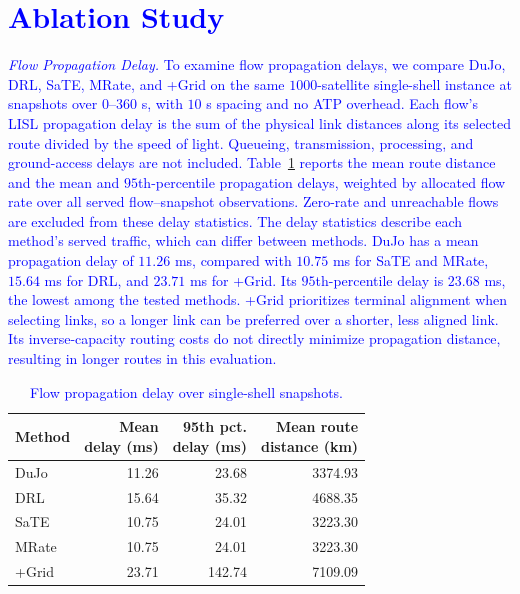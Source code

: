\documentclass[journal]{IEEEtran}
\newcommand{\blue}[1]{\textcolor{blue}{#1}}
\begin{document}
\section{\blue{Ablation Study}}\label{appendix:ablation_study}
\noindent\textit{\blue{Flow Propagation Delay.}} \blue{To examine flow propagation delays, we compare DuJo, DRL, SaTE, MRate, and +Grid on the same $1000$-satellite single-shell instance at snapshots over $0$--$360$ s, with $10$ s spacing and no ATP overhead. Each flow's LISL propagation delay is the sum of the physical link distances along its selected route divided by the speed of light. Queueing, transmission, processing, and ground-access delays are not included. Table~\ref{tab:flow_propagation_delay} reports the mean route distance and the mean and $95$th-percentile propagation delays, weighted by allocated flow rate over all served flow--snapshot observations. Zero-rate and unreachable flows are excluded from these delay statistics. The delay statistics describe each method's served traffic, which can differ between methods. DuJo has a mean propagation delay of $11.26$ ms, compared with $10.75$ ms for SaTE and MRate, $15.64$ ms for DRL, and $23.71$ ms for +Grid. Its $95$th-percentile delay is $23.68$ ms, the lowest among the tested methods. +Grid prioritizes terminal alignment when selecting links, so a longer link can be preferred over a shorter, less aligned link. Its inverse-capacity routing costs do not directly minimize propagation distance, resulting in longer routes in this evaluation.}

\begin{table}[t]
\centering
\caption{\blue{Flow propagation delay over single-shell snapshots.}}
\label{tab:flow_propagation_delay}
\small
{\color{blue}
\begin{tabular}{lrrr}
\hline
Method & \shortstack{Mean\\delay (ms)} & \shortstack{95th pct.\\delay (ms)} & \shortstack{Mean route\\distance (km)} \\
\hline
DuJo & 11.26 & 23.68 & 3374.93 \\
DRL & 15.64 & 35.32 & 4688.35 \\
SaTE & 10.75 & 24.01 & 3223.30 \\
MRate & 10.75 & 24.01 & 3223.30 \\
+Grid & 23.71 & 142.74 & 7109.09 \\
\hline
\end{tabular}
}
\end{table}
\end{document}
